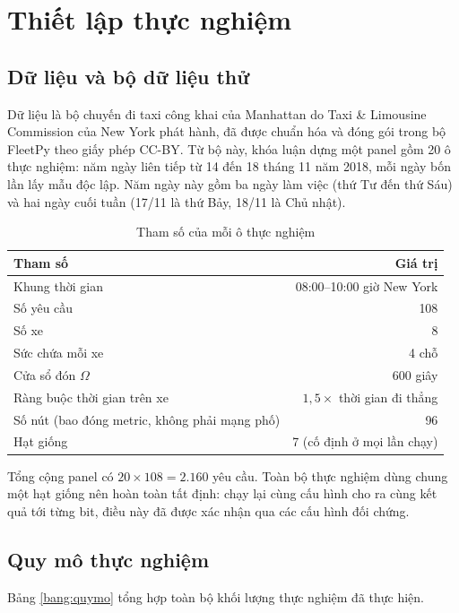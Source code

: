 \section{Thiết lập thực nghiệm}
\label{muc:thietlap}

\subsection{Dữ liệu và bộ dữ liệu thử}

Dữ liệu là bộ chuyến đi taxi công khai của Manhattan do Taxi \& Limousine Commission của New
York phát hành, đã được chuẩn hóa và đóng gói trong bộ FleetPy \cite{fleetpy2022} theo giấy
phép CC-BY. Từ bộ này, khóa luận dựng một panel gồm 20 ô thực nghiệm: năm ngày liên tiếp từ 14
đến 18 tháng 11 năm 2018, mỗi ngày bốn lần lấy mẫu độc lập. Năm ngày này gồm ba ngày làm việc (thứ Tư
đến thứ Sáu) và hai ngày cuối tuần (17/11 là thứ Bảy, 18/11 là Chủ nhật).

\begin{table}[htbp]
\centering
\caption{Tham số của mỗi ô thực nghiệm}
\label{bang:thamso}
\small
\begin{tabular}{@{}lr@{}}
\toprule
\textbf{Tham số} & \textbf{Giá trị}\\
\midrule
Khung thời gian & 08:00--10:00 giờ New York\\
Số yêu cầu & 108\\
Số xe & 8\\
Sức chứa mỗi xe & 4 chỗ\\
Cửa sổ đón $\Omega$ & 600 giây\\
Ràng buộc thời gian trên xe & $1{,}5 \times$ thời gian đi thẳng\\
Số nút (bao đóng metric, không phải mạng phố) & 96\\
Hạt giống & 7 (cố định ở mọi lần chạy)\\
\bottomrule
\end{tabular}
\end{table}

Tổng cộng panel có $20 \times 108 = 2{.}160$ yêu cầu. Toàn bộ thực nghiệm dùng chung một hạt
giống nên hoàn toàn tất định: chạy lại cùng cấu hình cho ra cùng kết quả tới từng bit, điều này
đã được xác nhận qua các cấu hình đối chứng.

\subsection{Quy mô thực nghiệm}

Bảng \ref{bang:quymo} tổng hợp toàn bộ khối lượng thực nghiệm đã thực hiện.

